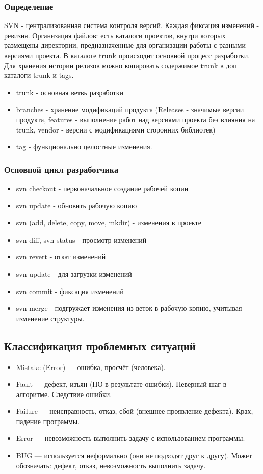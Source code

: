 \subsubsection{Определение}
SVN - централизованная система контроля версий. Каждая фиксация изменений - ревизия. 
Организация файлов: есть каталоги проектов, внутри которых размещены директории, предназначенные для организации работы с разными версиями проекта. В каталоге trunk происходит основной процесс разработки. Для хранения истории релизов можно копировать содержимое trunk в доп каталоги trunk и tags.  
\begin{itemize}
    \item trunk - основная ветвь разработки
    \item branches - хранение модификаций продукта (Releases - значимые версии продукта, features - выполнение работ над версиями проекта без влияния на trunk, vendor - версии с модификациями сторонних библиотек)
    \item tag - функционально целостные изменения.
\end{itemize}


\subsubsection{Основной цикл разработчика}
\begin{itemize}
    \item svn checkout - первоначальное создание рабочей копии
    \item svn update - обновить рабочую копию
    \item svn (add, delete, copy, move, mkdir) - изменения в проекте 
    \item svn diff, svn status - просмотр изменений
    \item svn revert - откат изменений
    \item svn update - для загрузки изменений 
    \item svn commit - фиксация изменений
    \item svn merge - подгружает изменения из веток в рабочую копию, учитывая изменение структуры.
\end{itemize}

\subsection{Классификация проблемных ситуаций}

\begin{itemize}
    \item Mistake (Error) — ошибка, просчёт (человека).
    \item Fault — дефект, изъян (ПО в результате ошибки). Неверный шаг в алгоритме. Следствие ошибки.
    \item Failure — неисправность, отказ, сбой (внешнее проявление дефекта). Крах, падение программы.
    \item Error — невозможность выполнить задачу с использованием программы.
    \item BUG — используется неформально (они не подходят друг к другу). Может обозначать: дефект, отказ, невозможность выполнить задачу.
\end{itemize}

